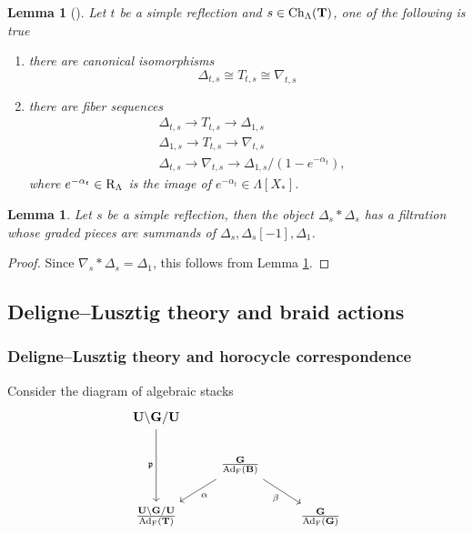 \documentclass[article, 10pt, oneside, reqno]{amsart}
\theoremstyle{plain}
\newtheorem{lem}[thm]{Lemma}
\theoremstyle{definition}
\theoremstyle{remark}
\begin{document}
\begin{lem}[]\label{lem:structure-simple-reflection}
Let $t$ be a simple reflection and $s \in \mathrm{Ch}_{\Lambda}(\mathbf{T})$, one of the following is true 
\begin{enumerate}
\item there are canonical isomorphisms 
$$\Delta_{t,s} \cong T_{t,s} \cong \nabla_{t,s}$$
\item there are fiber sequences 
\begin{align*}
&\Delta_{t,s} \to T_{t,s} \to \Delta_{1,s} \\
&\Delta_{1,s} \to T_{t,s} \to \nabla_{t,s} \\
&\Delta_{t,s} \to \nabla_{t,s} \to \Delta_{1,s}/(1 - e^{-\alpha_t}),
\end{align*}
where $e^{-\alpha_t} \in \mathrm{R}_{\Lambda}$ is the image of $e^{-\alpha_t} \in \Lambda[X_*]$.
\end{enumerate}
\end{lem}

\begin{lem}\label{lem:product-simple-reflection}
Let $s$ be a simple reflection, then the object $\Delta_s * \Delta_s$ has a filtration whose graded pieces are summands of $\Delta_s, \Delta_s[-1], \Delta_1$.
\end{lem}

\begin{proof}
Since $\nabla_s * \Delta_s = \Delta_1$, this follows from Lemma \ref{lem:structure-simple-reflection}.
\end{proof}

\subsection{Deligne--Lusztig theory and braid actions}\label{sec:braid-actions}

\subsubsection{Deligne--Lusztig theory and horocycle correspondence}
Consider the diagram of algebraic stacks 
\[\begin{tikzcd}
	{\Ubf \backslash \Gbf /\Ubf} && \\
	& {\frac{\Gbf}{\Ad_{\Frob}(\Bbf)}} \\
	{\frac{\Ubf \backslash \Gbf /\Ubf}{\Ad_{\Frob}(\Tbf)}} && {\frac{\Gbf}{\Ad_{\Frob}(\Gbf)}}
	\arrow["\pfrak"', from=1-1, to=3-1]
	\arrow["\alpha", from=2-2, to=3-1]
	\arrow["\beta"', from=2-2, to=3-3]
\end{tikzcd}\]
\end{document}
